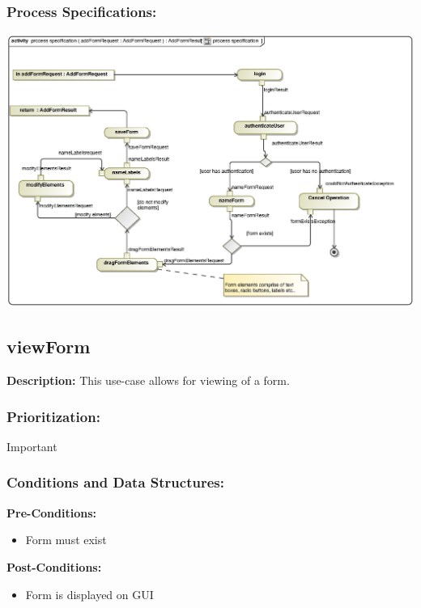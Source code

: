 \subsubsection{Process Specifications:} 
\includegraphics[width=1\linewidth]{./Graphics/FormUseCaseDiagrams/processspecification_AddForm}



\subsection{viewForm}
\textbf{Description:}
This use-case allows for viewing of a form.
\subsubsection{Prioritization:}
Important
\subsubsection{Conditions and Data Structures:}
\textbf{Pre-Conditions:}
\begin{itemize}
	\item Form must exist
\end{itemize}

\textbf{Post-Conditions:}	
\begin{itemize}
	\item Form is displayed on GUI
\end{itemize}

